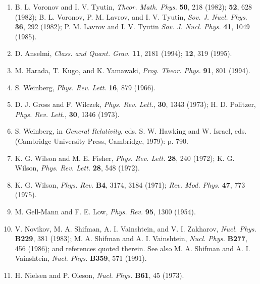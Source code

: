 \begin{enumerate}
\item B. L. Voronov and I. V. Tyutin, {\it Theor. Math.
Phys.} {\bf 50}, 218 (1982); {\bf 52}, 628 (1982); B. L.
Voronov, P. M. Lavrov, and I. V. Tyutin, {\em Sov. J. Nucl.
Phys.} {\bf 36}, 292 (1982); P. M. Lavrov and I. V. Tyutin
{\it Sov. J. Nucl. Phys.} {\bf 41}, 1049 (1985).

\item D. Anselmi, {\em Class. and Quant. Grav.} {\bf 11},
2181 (1994); {\bf 12}, 319 (1995).

\item M. Harada, T. Kugo, and K. Yamawaki, {\em Prog. Theor.
Phys.} {\bf 91}, 801 (1994).

\item S. Weinberg, {\em Phys. Rev. Lett.} {\bf 16}, 879
(1966).


\item D. J. Gross and F. Wilczek, {\it Phys. Rev. Lett.},
{\bf 30}, 1343 (1973); H. D. Politzer, {\it Phys. Rev.
Lett.}, {\bf 30}, 1346 (1973).

\item S. Weinberg, in  {\it General Relativity},  eds. S. W.
Hawking and W. Israel, eds. (Cambridge University Press,
Cambridge, 1979): p. 790.

\item K. G. Wilson and M. E.  Fisher, {\it Phys. Rev. Lett.}
{\bf 28}, 240 (1972); K. G. Wilson, {\it Phys. Rev. Lett.}
{\bf 28}, 548 (1972).


\item K. G. Wilson, {\it Phys. Rev.} {\bf B4}, 3174, 3184
(1971); {\it Rev. Mod. Phys.} {\bf 47}, 773 (1975).

\item M. Gell-Mann and F. E.  Low, {\em Phys. Rev.} {\bf
95}, 1300 (1954).

\item V. Novikov, M. A. Shifman, A. I. Vainshtein, and V. I.
Zakharov, {\it Nucl. Phys.}  {\bf B229}, 381 (1983); M. A.
Shifman and  A. I. Vainshtein,  {\it Nucl. Phys.}  {\bf
B277}, 456 (1986); and references quoted therein.  See also
M. A. Shifman and  A. I. Vainshtein,  {\it Nucl. Phys.}
{\bf B359}, 571 (1991).

\item H. Nielsen and P. Oleson, {\em Nucl. Phys.} {\bf B61},
45 (1973).


\end{enumerate}










